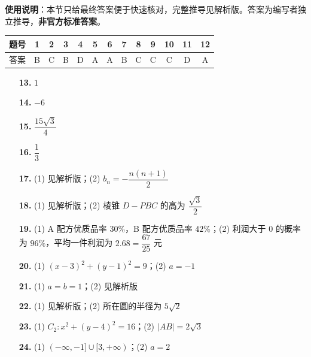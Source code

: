 
\begin{gknotice}
\textbf{使用说明}：本节只给最终答案便于快速核对，完整推导见解析版。答案为编写者独立推导，\textbf{非官方标准答案}。
\end{gknotice}

\begin{center}\begin{tabular}{ccccccccccccc}
\toprule
题号 & 1 & 2 & 3 & 4 & 5 & 6 & 7 & 8 & 9 & 10 & 11 & 12 \\
\midrule
答案 & B & C & B & D & A & A & B & C & C & C & D & A \\
\bottomrule
\end{tabular}\end{center}

\begin{itemize}[leftmargin=2.6em]
  \item[\textbf{13.}] $1$
  \item[\textbf{14.}] $-6$
  \item[\textbf{15.}] $\dfrac{15\sqrt3}{4}$
  \item[\textbf{16.}] $\dfrac13$
\end{itemize}

\begin{itemize}[leftmargin=2.6em]
  \item[\textbf{17.}] (1) 见解析版；(2) $b_n=-\dfrac{n(n+1)}2$
  \item[\textbf{18.}] (1) 见解析版；(2) 棱锥 $D-PBC$ 的高为 $\dfrac{\sqrt3}{2}$
  \item[\textbf{19.}] (1) A 配方优质品率 $30\%$，B 配方优质品率 $42\%$；(2) 利润大于 $0$ 的概率为 $96\%$，平均一件利润为 $2.68=\dfrac{67}{25}$ 元
  \item[\textbf{20.}] (1) $(x-3)^2+(y-1)^2=9$；(2) $a=-1$
  \item[\textbf{21.}] (1) $a=b=1$；(2) 见解析版
  \item[\textbf{22.}] (1) 见解析版；(2) 所在圆的半径为 $5\sqrt2$
  \item[\textbf{23.}] (1) $C_2:x^2+(y-4)^2=16$；(2) $|AB|=2\sqrt3$
  \item[\textbf{24.}] (1) $(-\infty,-1]\cup[3,+\infty)$；(2) $a=2$
\end{itemize}
